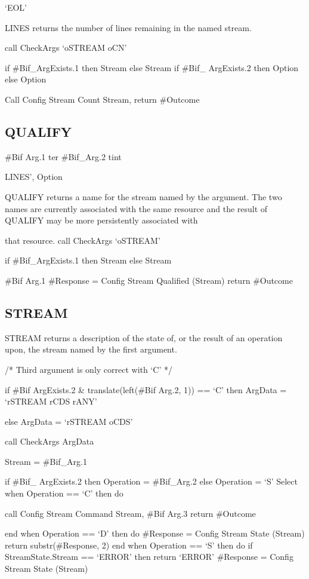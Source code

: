 `EOL'

LINES returns the number of lines remaining in the named stream.

call CheckArgs `oSTREAM oCN'

if \#Bif\_ArgExists.1 then Stream else Stream if \#Bif\_ ArgExists.2
then Option else Option

Call Config Stream Count Stream, return \#Outcome

\subsection{QUALIFY}\label{qualify}

\#Bif Arg.1 ter \#Bif\_Arg.2 tint

LINES', Option

QUALIFY returns a name for the stream named by the argument. The two
names are currently associated with the same resource and the result of
QUALIFY may be more persistently associated with

that resource. call CheckArgs `oSTREAM'

if \#Bif\_ArgExists.1 then Stream else Stream

\#Bif Arg.1 \#Response = Config Stream Qualified (Stream) return
\#Outcome

\subsection{STREAM}\label{stream}

STREAM returns a description of the state of, or the result of an
operation upon, the stream named by the first argument.

/* Third argument is only correct with `C' */

if \#Bif ArgExists.2 \& translate(left(\#Bif Arg.2, 1)) == `C' then
ArgData = `rSTREAM rCDS rANY'

else ArgData = `rSTREAM oCDS'

call CheckArgs ArgData

Stream = \#Bif\_Arg.1

if \#Bif\_ ArgExists.2 then Operation = \#Bif\_Arg.2 else Operation =
`S' Select when Operation == `C' then do

call Config Stream Command Stream, \#Bif Arg.3 return \#Outcome

end when Operation == `D' then do \#Response = Config Stream State
(Stream) return substr(\#Response, 2) end when Operation == `S' then do
if StreamState.Stream == `ERROR' then return `ERROR' \#Response = Config
Stream State (Stream)

